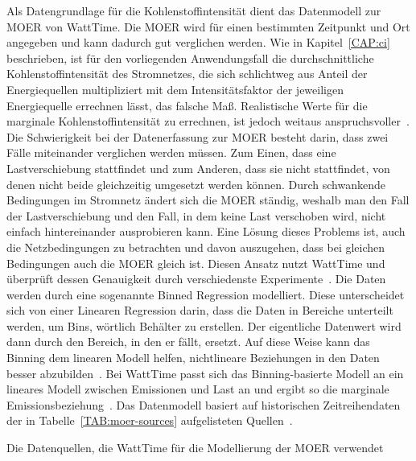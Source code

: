 Als Datengrundlage für die Kohlenstoffintensität dient das Datenmodell zur \ac{MOER} von WattTime.
Die \ac{MOER} wird für einen bestimmten Zeitpunkt und Ort angegeben und kann dadurch gut verglichen werden.
Wie in Kapitel~\ref{CAP:ci} beschrieben, ist für den vorliegenden Anwendungsfall die durchschnittliche Kohlenstoffintensität des Stromnetzes, die sich schlichtweg aus Anteil der Energiequellen multipliziert mit dem Intensitätsfaktor der jeweiligen Energiequelle errechnen lässt, das falsche Maß.
Realistische Werte für die marginale Kohlenstoffintensität zu errechnen, ist jedoch weitaus anspruchsvoller~\cite{WattTime.11212023}.
Die Schwierigkeit bei der Datenerfassung zur \ac{MOER} besteht darin, dass zwei Fälle miteinander verglichen werden müssen.
Zum Einen, dass eine Lastverschiebung stattfindet und zum Anderen, dass sie nicht stattfindet, von denen nicht beide gleichzeitig umgesetzt werden können.
Durch schwankende Bedingungen im Stromnetz ändert sich die \ac{MOER} ständig, weshalb man den Fall der Lastverschiebung und den Fall, in dem keine Last verschoben wird, nicht einfach hintereinander ausprobieren kann.
Eine Lösung dieses Problems ist, auch die Netzbedingungen zu betrachten und davon auszugehen, dass bei gleichen Bedingungen auch die \ac{MOER} gleich ist.
Diesen Ansatz nutzt WattTime und überprüft dessen Genauigkeit durch verschiedenste Experimente~\cite{WattTime.2022}.
Die Daten werden durch eine sogenannte Binned Regression modelliert.
Diese unterscheidet sich von einer Linearen Regression darin, dass die Daten in Bereiche unterteilt werden, um \glqq Bins\grqq{}, wörtlich Behälter zu erstellen.
Der eigentliche Datenwert wird dann durch den Bereich, in den er fällt, ersetzt.
Auf diese Weise kann das \glqq Binning\grqq{} dem linearen Modell helfen, nichtlineare Beziehungen in den Daten besser abzubilden~\cite{Muller.2017}.
Bei WattTime passt sich das Binning-basierte Modell an ein lineares Modell zwischen Emissionen und Last an und ergibt so die marginale Emissionsbeziehung~\cite{WattTime.2022}.
Das Datenmodell basiert auf historischen Zeitreihendaten der in Tabelle~\ref{TAB:moer-sources} aufgelisteten Quellen~\cite{WattTime.11212023}.
\begin{table}[t]
 \caption[Datenquellen MOER Modellierung]{Die Datenquellen, die WattTime für die Modellierung der MOER verwendet~\cite{WattTime.11212023}}
 \label{TAB:moer-sources}
 
\end{table}

